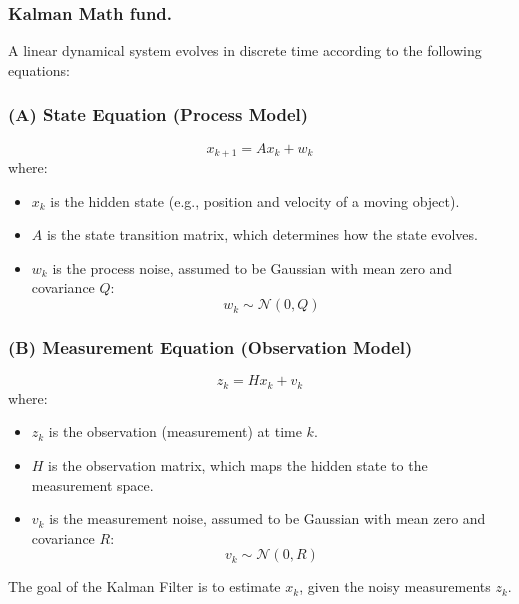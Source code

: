 \documentclass{article}
\begin{document}
\subsubsection*{Kalman Math fund.}

A linear dynamical system evolves in discrete time according to the following equations:

\subsubsection*{(A) State Equation (Process Model)}
\[
x_{k+1} = A x_k + w_k
\]
where:
\begin{itemize}
    \item \(x_k\) is the hidden state (e.g., position and velocity of a moving object).
    \item \(A\) is the state transition matrix, which determines how the state evolves.
    \item \(w_k\) is the process noise, assumed to be Gaussian with mean zero and covariance \(Q\):
    \[
    w_k \sim \mathcal{N}(0, Q)
    \]
\end{itemize}

\subsubsection*{(B) Measurement Equation (Observation Model)}
\[
z_k = H x_k + v_k
\]
where:
\begin{itemize}
    \item \(z_k\) is the observation (measurement) at time \(k\).
    \item \(H\) is the observation matrix, which maps the hidden state to the measurement space.
    \item \(v_k\) is the measurement noise, assumed to be Gaussian with mean zero and covariance \(R\):
    \[
    v_k \sim \mathcal{N}(0, R)
    \]
\end{itemize}

The goal of the Kalman Filter is to estimate \(x_k\), given the noisy measurements \(z_k\).
\end{document}
